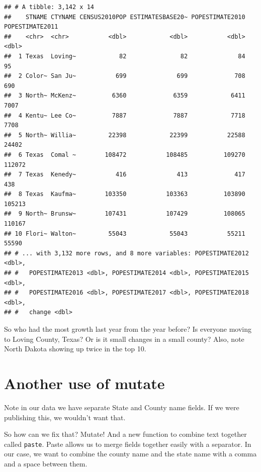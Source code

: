 \documentclass[]{book}
\newenvironment{Shaded}{\begin{snugshade}}{\end{snugshade}}
\newcommand{\DataTypeTok}[1]{\textcolor[rgb]{0.13,0.29,0.53}{#1}}
\newcommand{\DecValTok}[1]{\textcolor[rgb]{0.00,0.00,0.81}{#1}}
\newcommand{\KeywordTok}[1]{\textcolor[rgb]{0.13,0.29,0.53}{\textbf{#1}}}
\newcommand{\NormalTok}[1]{#1}
\newcommand{\OperatorTok}[1]{\textcolor[rgb]{0.81,0.36,0.00}{\textbf{#1}}}
\newcommand{\StringTok}[1]{\textcolor[rgb]{0.31,0.60,0.02}{#1}}
\begin{document}
\begin{verbatim}
## # A tibble: 3,142 x 14
##    STNAME CTYNAME CENSUS2010POP ESTIMATESBASE20~ POPESTIMATE2010 POPESTIMATE2011
##    <chr>  <chr>           <dbl>            <dbl>           <dbl>           <dbl>
##  1 Texas  Loving~            82               82              84              95
##  2 Color~ San Ju~           699              699             708             690
##  3 North~ McKenz~          6360             6359            6411            7007
##  4 Kentu~ Lee Co~          7887             7887            7718            7708
##  5 North~ Willia~         22398            22399           22588           24402
##  6 Texas  Comal ~        108472           108485          109270          112072
##  7 Texas  Kenedy~           416              413             417             438
##  8 Texas  Kaufma~        103350           103363          103890          105213
##  9 North~ Brunsw~        107431           107429          108065          110167
## 10 Flori~ Walton~         55043            55043           55211           55590
## # ... with 3,132 more rows, and 8 more variables: POPESTIMATE2012 <dbl>,
## #   POPESTIMATE2013 <dbl>, POPESTIMATE2014 <dbl>, POPESTIMATE2015 <dbl>,
## #   POPESTIMATE2016 <dbl>, POPESTIMATE2017 <dbl>, POPESTIMATE2018 <dbl>,
## #   change <dbl>
\end{verbatim}

So who had the most growth last year from the year before? Is everyone moving to Loving County, Texas? Or is it small changes in a small county? Also, note North Dakota showing up twice in the top 10.

\hypertarget{another-use-of-mutate}{%
\section{Another use of mutate}\label{another-use-of-mutate}}

Note in our data we have separate State and County name fields. If we were publishing this, we wouldn't want that.

So how can we fix that? Mutate! And a new function to combine text together called \texttt{paste}. Paste allows us to merge fields together easily with a separator. In our case, we want to combine the county name and the state name with a comma and a space between them.

\begin{Shaded}
\end{Shaded}
\end{document}
